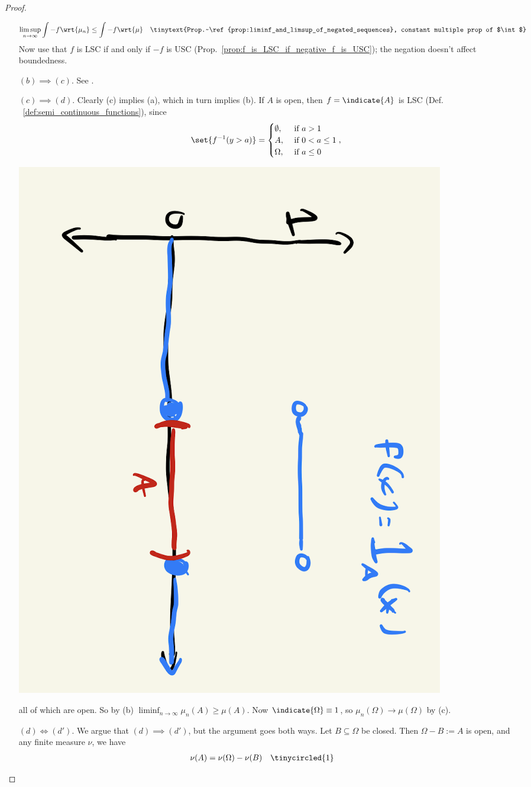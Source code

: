 \documentclass{article} %
\begin{document}
\begin{proof}
\begin{itemize}
\begin{align*}
\limsup_{n \to \infty} \int - f \wrt{\mu_n} & \leq  \int - f \wrt{\mu} && \tinytext{Prop.~\ref{prop:liminf_and_limsup_of_negated_sequences}, constant multiple prop of $\int$}  \\
\end{align*}
Now use that $f$ is LSC if and only if $-f$ is USC (Prop.~\ref{prop:f_is_LSC_if_negative_f_is_USC}); the negation doesn't affect boundedness. 
\item [$\boxed{(b) \implies (c).}$] See \cite{ash2000probability}.
\item [$\boxed{(c) \implies (d).}$] Clearly (c) implies (a), which in turn implies (b).  If $A$ is open, then $f=\indicate{A}$ is LSC (Def. ~\ref{def:semi_continuous_functions}), since
\[ 
\set{f^{-1}(y > a)} = 
\begin{cases}
\emptyset, & \text { if } a > 1 \\
A, &\text{ if } 0 < a \leq 1\\
\Omega, &\text{ if } a \leq 0	
\end{cases},
\]
\begin{center}
\includegraphics[angle=90, width=.3\textwidth]{images/indicator_of_open_interval}	
\end{center}
all of which are open. So by (b) $\liminf_{n \to \infty} \mu_n(A) \geq \mu(A)$.  Now $\indicate{\Omega} \equiv 1$, so $\mu_n(\Omega) \to \mu(\Omega)$ by (c). 
\item [$\boxed{(d) \iff (d').}$]  We argue that $(d) \implies (d')$, but the argument goes both ways.  Let $B \subseteq \Omega$ be closed.  Then $\Omega - B := A$ is open, and any finite measure $\nu$, we have 
\begin{align*}
\nu(A) &= \nu(\Omega) - \nu(B) && \tinycircled{1} 	
\end{align*}


\end{itemize}
\end{proof}
\end{document}
